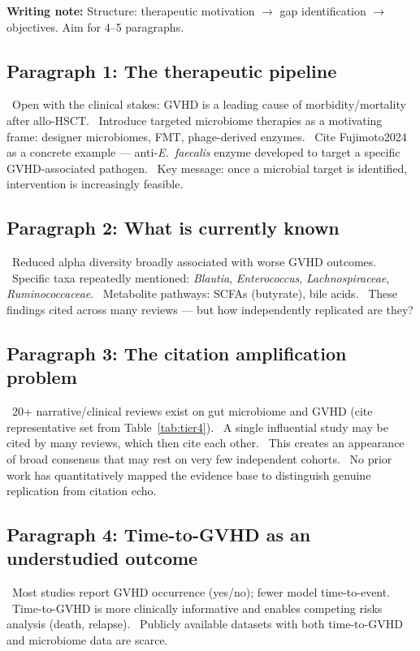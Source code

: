 \documentclass[11pt,a4paper]{article}
\newcommand{\todoitem}[1]{\textcolor{blue!70!black}{\textbullet~#1}}
\newcommand{\writingnote}[1]{\par\noindent\colorbox{yellow!30}{\parbox{\dimexpr\linewidth-2\fboxsep}{%
  \small\textbf{Writing note:} #1}}\par\medskip}
\begin{document}
\writingnote{Structure: therapeutic motivation $\to$ gap identification $\to$ objectives. Aim for 4--5 paragraphs.}

\subsection*{Paragraph 1: The therapeutic pipeline}
\todoitem{Open with the clinical stakes: GVHD is a leading cause of morbidity/mortality after allo-HSCT.}
\todoitem{Introduce targeted microbiome therapies as a motivating frame: designer microbiomes, FMT, phage-derived enzymes.}
\todoitem{Cite Fujimoto2024 as a concrete example --- anti-\textit{E.~faecalis} enzyme developed to target a specific GVHD-associated pathogen.}
\todoitem{Key message: once a microbial target is identified, intervention is increasingly feasible.}

\subsection*{Paragraph 2: What is currently known}
\todoitem{Reduced alpha diversity broadly associated with worse GVHD outcomes.}
\todoitem{Specific taxa repeatedly mentioned: \textit{Blautia}, \textit{Enterococcus}, \textit{Lachnospiraceae}, \textit{Ruminococcaceae}.}
\todoitem{Metabolite pathways: SCFAs (butyrate), bile acids.}
\todoitem{These findings cited across many reviews --- but how independently replicated are they?}

\subsection*{Paragraph 3: The citation amplification problem}
\todoitem{20+ narrative/clinical reviews exist on gut microbiome and GVHD (cite representative set from Table~\ref{tab:tier4}).}
\todoitem{A single influential study may be cited by many reviews, which then cite each other.}
\todoitem{This creates an appearance of broad consensus that may rest on very few independent cohorts.}
\todoitem{No prior work has quantitatively mapped the evidence base to distinguish genuine replication from citation echo.}

\subsection*{Paragraph 4: Time-to-GVHD as an understudied outcome}
\todoitem{Most studies report GVHD occurrence (yes/no); fewer model time-to-event.}
\todoitem{Time-to-GVHD is more clinically informative and enables competing risks analysis (death, relapse).}
\todoitem{Publicly available datasets with both time-to-GVHD and microbiome data are scarce.}
\end{document}
